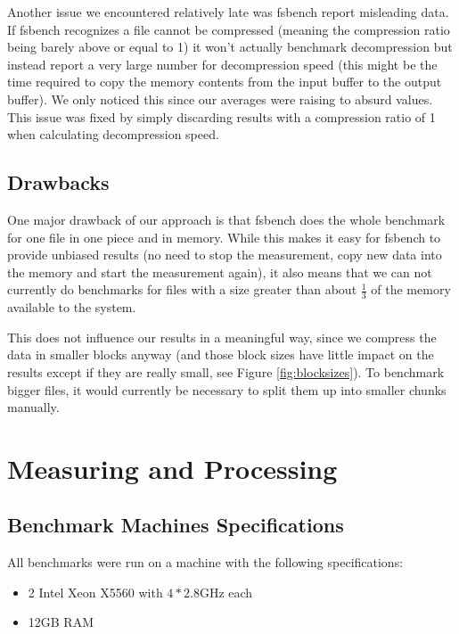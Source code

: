\documentclass[
	12pt,
	a4paper,
	BCOR10mm,
	DIV14,
	listof=totoc,
	bibliography=totoc,
	headsepline
]{scrreprt}
\begin{document}
Another issue we encountered relatively late was fsbench report misleading data. If fsbench recognizes a file cannot be compressed (meaning the compression ratio being barely above or equal to 1) it won't actually benchmark decompression but instead report a very large number for decompression speed (this might be the time required to copy the memory contents from the input buffer to the output buffer). We only noticed this since our averages were raising to absurd values. This issue was fixed by simply discarding results with a compression ratio of 1 when calculating decompression speed.

\section{Drawbacks}

One major drawback of our approach is that fsbench does the whole benchmark for one file in one piece and in memory. While this makes it easy for fsbench to provide unbiased results (no need to stop the measurement, copy new data into the memory and start the measurement again), it also means that we can not currently do benchmarks for files with a size greater than about \(\frac{1}{3}\) of the memory available to the system.

This does not influence our results in a meaningful way, since we compress the data in smaller blocks anyway (and those block sizes have little impact on the results except if they are really small, see Figure \ref{fig:blocksizes}). To benchmark bigger files, it would currently be necessary to split them up into smaller chunks manually.

\chapter{Measuring and Processing}
\label{Measuring and Processing}

\section{Benchmark Machines Specifications}
All benchmarks were run on a machine with the following specifications:

\begin{itemize}
\item 2 Intel Xeon X5560 with \(4 * 2.8\text{GHz}\) each
\item 12GB RAM
\end{itemize}
\end{document}

